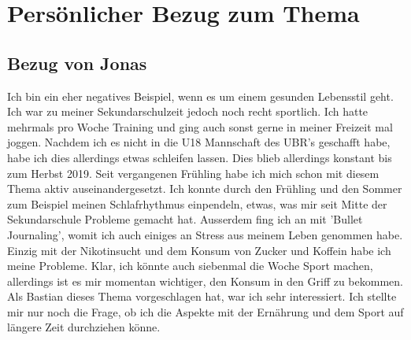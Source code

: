 \chapter{Persönlicher Bezug zum Thema}
\section{Bezug von Jonas}
Ich bin ein eher negatives Beispiel, wenn es um einem gesunden Lebensstil geht. Ich war zu meiner Sekundarschulzeit jedoch noch recht sportlich. Ich hatte mehrmals pro Woche Training und ging auch sonst gerne in meiner Freizeit mal joggen. Nachdem ich es nicht in die U18 Mannschaft des UBR's geschafft habe, habe ich dies allerdings etwas schleifen lassen.
\newline
Dies blieb allerdings konstant bis zum Herbst 2019. Seit vergangenen Frühling habe ich mich schon mit diesem Thema aktiv auseinandergesetzt. Ich konnte durch den Frühling und den Sommer zum Beispiel meinen Schlafrhythmus einpendeln, etwas, was mir seit Mitte der Sekundarschule Probleme gemacht hat. Ausserdem fing ich an mit 'Bullet Journaling', womit ich auch einiges an Stress aus meinem Leben genommen habe. Einzig mit der Nikotinsucht und dem Konsum von Zucker und Koffein habe ich meine Probleme. Klar, ich könnte auch siebenmal die Woche Sport machen, allerdings ist es mir momentan wichtiger, den Konsum in den Griff zu bekommen.
\newline
\newline
Als Bastian dieses Thema vorgeschlagen hat, war ich sehr interessiert. Ich stellte mir nur noch die Frage, ob ich die Aspekte mit der Ernährung und dem Sport auf längere Zeit durchziehen könne.